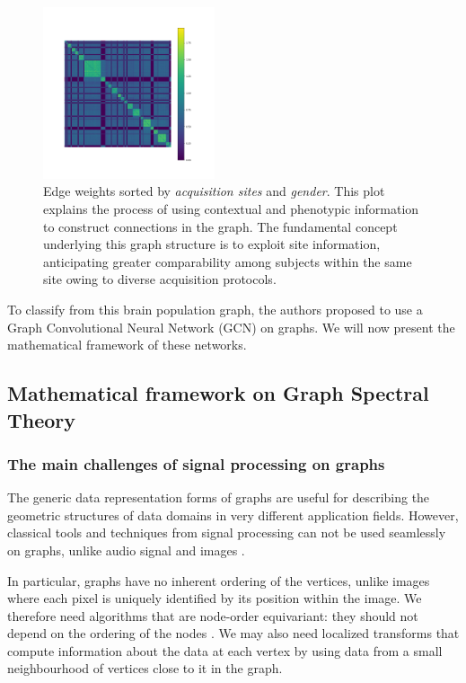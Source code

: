 \begin{figure}[h!]
    \centering
    \includegraphics[width=0.45\textwidth]{figures/sorted_adjacency_by_site_id_by_sex.png}
    \caption{Edge weights sorted by \textit{acquisition sites} and \textit{gender}. This plot explains the process of using contextual and phenotypic information to construct connections in the graph. The fundamental concept underlying this graph structure is to exploit site information, anticipating greater comparability among subjects within the same site owing to diverse acquisition protocols.}
    \Description{}
    \label{fig:sorted_adjacency}
\end{figure}

To classify from this brain population graph, the authors \cite{Parisot17} proposed to use a Graph Convolutional Neural Network (GCN) on graphs. We will now present the mathematical framework of these networks.

\subsection{Mathematical framework on Graph Spectral Theory}
\subsubsection{The main challenges of signal processing on graphs} 

The generic data representation forms of graphs are useful for describing the geometric structures of data domains in very different application fields.
However, classical tools and techniques from signal processing can not be used seamlessly on graphs, unlike audio signal and images \cite{shuman_emerging_2013}.

In particular, graphs have no inherent ordering of the vertices, unlike images where each pixel is uniquely identified by its position within the image. We therefore need algorithms that are node-order equivariant: they should not depend on the ordering of the nodes \cite{daigavane_understanding_2021}. We may also need localized transforms that compute information about the data at each vertex by using data from a small neighbourhood of vertices close to it in the graph.

